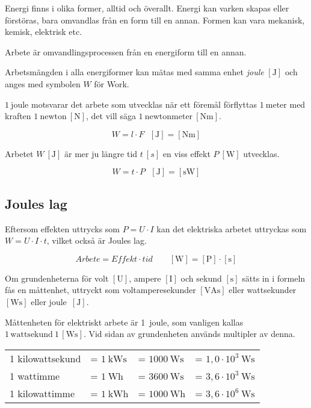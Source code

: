 Energi finns i olika former, alltid och överallt.
Energi kan varken skapas eller förstöras, bara omvandlas från en form till en
annan.
Formen kan vara mekanisk, kemisk, elektrisk etc.

Arbete är omvandlingsprocessen från en energiform till en annan.

Arbetsmängden i alla energiformer kan mätas med samma enhet \emph{joule}
\(\mathrm{[J]}\) \cite{SIbrochure8} och anges med symbolen \(W\) för Work.

\(1\ \mathrm{joule}\) motsvarar det arbete som utvecklas när ett föremål
förflyttas \(1\ \mathrm{meter}\) med kraften \(1\ \mathrm{newton\ [N]}\),
det vill säga \(1\ \mathrm{newtonmeter\ [Nm]}\).

\[W = l \cdot F \ \ \ \mathrm{[J] = [Nm]}\]

Arbetet \(W\ \mathrm{[J]}\) är mer ju längre tid \(t\ [s]\) en viss effekt
\(P\ \mathrm{[W]}\) utvecklas.

\[W = t \cdot P \ \ \ \mathrm{[J] = [sW]}\]

\subsection{Joules lag}
\label{joules_lag}


Eftersom effekten uttrycks som \(P = U \cdot I\) kan det elektriska arbetet
uttryckas som \(W = U \cdot I \cdot t\), vilket också är Joules lag.

\[\textit{Arbete} = \textit{Effekt} \cdot \textit{tid}\qquad \mathrm{[W]} = \mathrm{[P]} \cdot \mathrm{[s]}\]

Om grundenheterna för volt \(\mathrm{[U]}\), ampere \(\mathrm{[I]}\) och
sekund \(\mathrm{[s]}\) sätts in i formeln fås en måttenhet, uttryckt som
voltamperesekunder \(\mathrm{[VAs]}\) eller wattsekunder \(\mathrm{[Ws]}\)
eller joule\ \(\mathrm{[J]}\).

Måttenheten för elektriskt arbete är 1~joule, som vanligen
kallas \(1\,\mathrm{wattsekund}\ 1\,\mathrm{[Ws]}\).
Vid sidan av grundenheten används multipler av denna.

\begin{center}
\small
\noindent
\begin{tabular}{@{}l@{\,}l@{}l@{}l@{}}
   1 kilowattsekund & = $1\ \text{kWs}$ & = $1000\ \text{Ws}$ & = $1,0\cdot 10^3\ \text{Ws}$ \\
   1 wattimme       & = $1\ \text{Wh}$  & = $3600\ \text{Ws}$ & = $3,6\cdot 10^3\ \text{Ws}$ \\
   1 kilowattimme   & = $1\ \text{kWh}$ & = $1000\ \text{Wh}$ & = $3,6\cdot 10^6\ \text{Ws}$
\end{tabular}
\end{center}

